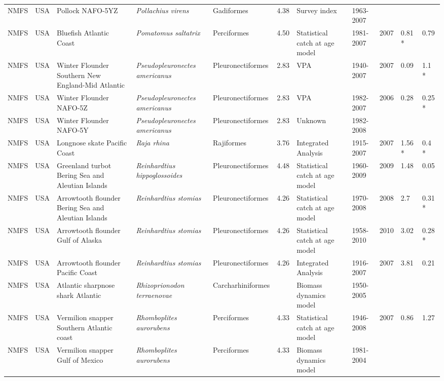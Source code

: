 \begin{longtable}{p{1.5cm}p{1.5cm}p{3cm}p{3cm}p{2.5cm}p{0.9cm}p{1.4cm}p{0.9cm}p{0.9cm}p{0.9cm}p{1cm}}
  NMFS & USA & Pollock NAFO-5YZ & \textit{Pollachius virens} & Gadiformes & 4.38 & Survey index & 1963-2007 &  &  &  \\ 
  NMFS & USA & Bluefish Atlantic Coast & \textit{Pomatomus saltatrix} & Perciformes & 4.50 & Statistical catch at age model & 1981-2007 & 2007 & 0.81 * & 0.79 \\ 
  NMFS & USA & Winter Flounder Southern New England-Mid Atlantic & \textit{Pseudopleuronectes americanus} & Pleuronectiformes & 2.83 & VPA & 1940-2007 & 2007 & 0.09 & 1.1 * \\ 
  NMFS & USA & Winter Flounder NAFO-5Z & \textit{Pseudopleuronectes americanus} & Pleuronectiformes & 2.83 & VPA & 1982-2007 & 2006 & 0.28 & 0.25 * \\ 
  NMFS & USA & Winter Flounder NAFO-5Y & \textit{Pseudopleuronectes americanus} & Pleuronectiformes & 2.83 & Unknown & 1982-2008 &  &  &  \\ 
  NMFS & USA & Longnose skate Pacific Coast & \textit{Raja rhina} & Rajiformes & 3.76 & Integrated Analysis & 1915-2007 & 2007 & 1.56 * & 0.4 * \\ 
  NMFS & USA & Greenland turbot Bering Sea and Aleutian Islands & \textit{Reinhardtius hippoglossoides} & Pleuronectiformes & 4.48 & Statistical catch at age model & 1960-2009 & 2009 & 1.48 & 0.05 \\ 
  NMFS & USA & Arrowtooth flounder Bering Sea and Aleutian Islands & \textit{Reinhardtius stomias} & Pleuronectiformes & 4.26 & Statistical catch at age model & 1970-2008 & 2008 & 2.7 & 0.31 * \\ 
  NMFS & USA & Arrowtooth flounder Gulf of Alaska & \textit{Reinhardtius stomias} & Pleuronectiformes & 4.26 & Statistical catch at age model & 1958-2010 & 2010 & 3.02 & 0.28 * \\ 
  NMFS & USA & Arrowtooth flounder Pacific Coast & \textit{Reinhardtius stomias} & Pleuronectiformes & 4.26 & Integrated Analysis & 1916-2007 & 2007 & 3.81 & 0.21 \\ 
  NMFS & USA & Atlantic sharpnose shark Atlantic & \textit{Rhizoprionodon terraenovae} & Carcharhiniformes &  & Biomass dynamics model & 1950-2005 &  &  &  \\ 
  NMFS & USA & Vermilion snapper Southern Atlantic coast & \textit{Rhomboplites aurorubens} & Perciformes & 4.33 & Statistical catch at age model & 1946-2008 & 2007 & 0.86 & 1.27 \\ 
  NMFS & USA & Vermilion snapper Gulf of Mexico & \textit{Rhomboplites aurorubens} & Perciformes & 4.33 & Biomass dynamics model & 1981-2004 &  &  &  \\ 

\end{longtable}
